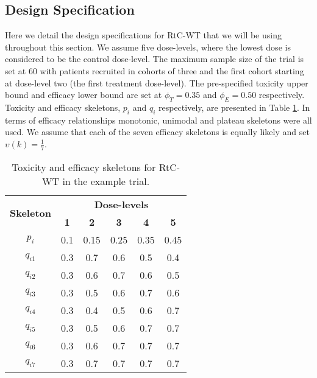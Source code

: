 \subsection{Design Specification}
\label{WT:Design-Spec}

Here we detail the design specifications for RtC-WT that we will be using throughout this section. We assume five dose-levels, where the lowest dose is considered to be the control dose-level. The maximum sample size of the trial is set at 60 with patients recruited in cohorts of three and the first cohort starting at dose-level two (the first treatment dose-level). The pre-specified toxicity upper bound and efficacy lower bound are set at $\phi_T = 0.35$ and $\phi_E = 0.50$ respectively. Toxicity and efficacy skeletons, $p_i$ and $q_i$ respectively, are presented in Table \ref{tab_wt:tox-eff-skeleton}. In terms of efficacy relationships monotonic, unimodal and plateau skeletons were all used. We assume that each of the seven efficacy skeletons is equally likely and set $\upsilon(k) = \frac{1}{7}$. 


\begin{table}[!h]
	\centering
	\caption{Toxicity and efficacy skeletons for RtC-WT in the example trial.}
	\label{tab_wt:tox-eff-skeleton}
	\begin{tabular}{c|ccccc}
		\hline
		\multicolumn{1}{c|}{\multirow{2}{*}{\textbf{Skeleton}}} & \multicolumn{5}{c}{\textbf{Dose-levels}}                       \\
		\multicolumn{1}{c|}{}                                   & \textbf{1} & \textbf{2} & \textbf{3} & \textbf{4} & \textbf{5} \\ \hline
		$p_i$    & 0.1 & 0.15 & 0.25 & 0.35 & 0.45 \\
		$q_{i1}$ & 0.3 & 0.7 & 0.6 & 0.5 & 0.4 \\
		$q_{i2}$ & 0.3 & 0.6 & 0.7 & 0.6 & 0.5 \\
		$q_{i3}$ & 0.3 & 0.5 & 0.6 & 0.7 & 0.6 \\
		$q_{i4}$ & 0.3 & 0.4 & 0.5 & 0.6 & 0.7 \\
		$q_{i5}$ & 0.3 & 0.5 & 0.6 & 0.7 & 0.7 \\
		$q_{i6}$ & 0.3 & 0.6 & 0.7 & 0.7 & 0.7 \\
		$q_{i7}$ & 0.3 & 0.7 & 0.7 & 0.7 & 0.7 \\ \hline
	\end{tabular}
\end{table}

